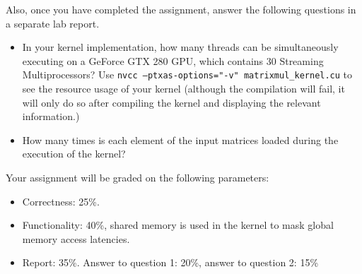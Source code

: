 \documentclass[11.5pt]{article}
\begin{document}
\noindent Also, once you have completed the assignment, answer the following questions in a separate lab report. 
\begin{itemize}
\item In your kernel implementation, how many threads can be simultaneously executing on a GeForce GTX 280 GPU, which contains 30 Streaming Multiprocessors? Use \texttt{nvcc --ptxas-options="-v" matrixmul\_kernel.cu} to see the resource usage of your kernel (although the compilation will fail, it will only do so after compiling the kernel and displaying the relevant information.)
    
\item How many times is each element of the input matrices loaded during the execution of the kernel?
\end{itemize}
\vspace{24pt}

\noindent Your assignment will be graded on the following parameters:
\begin{itemize}
\item Correctness: 25\%.

\item Functionality: 40\%, shared memory is used in the kernel to mask global memory access latencies.
    
\item Report: 35\%. Answer to question 1: 20\%, answer to question 2: 15\%
\end{itemize}
\end{document}
